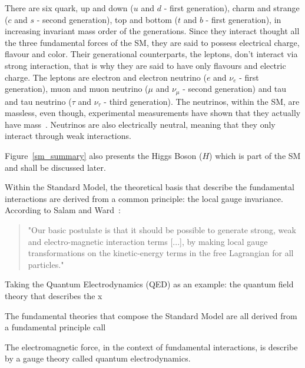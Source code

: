 There are six quark, up and down ($u$ and $d$ - first generation), charm and strange ($c$ and $s$ - second generation), top and bottom ($t$ and $b$ - first generation), in increasing invariant mass order of the generations. Since they interact thought all the three fundamental forces of the SM, they are said to possess electrical charge, flavour and color. Their generational counterparts, the leptons, don't interact via strong interaction, that is why they are said to have only flavours and electric charge. The leptons are electron and electron neutrino ($e$ and $\nu_e$ - first generation), muon and muon neutrino ($\mu$ and $\nu_{\mu}$ - second generation) and tau and tau neutrino ($\tau$ and $\nu_{\tau}$ - third generation). The neutrinos, within the SM, are massless, even though, experimental measurements have shown that they actually have mass~\cite{Patrignani:2016xqp}. Neutrinos are also electrically neutral, meaning that they only interact through weak interactions.

Figure~\ref{sm_summary} also presents the Higgs Boson ($H$) which is part of the SM and shall be discussed later.

Within the Standard Model, the theoretical basis that describe the fundamental interactions are derived from a common principle: the local gauge invariance. According to Salam and Ward~\cite{ward_salam}:


\begin{quote}
  "Our basic postulate is that it should be possible to generate strong, weak and electro-magnetic interaction terms [...], by making local gauge transformations on the kinetic-energy terms in the free Lagrangian for all particles."
\end{quote}

Taking the Quantum Electrodynamics (QED) as an example: the quantum field theory that describes the x


The fundamental theories that compose the Standard Model are all derived from a fundamental principle call 

The electromagnetic force, in the context of fundamental interactions, is describe by a gauge theory called quantum electrodynamics. 









